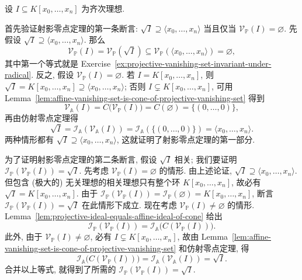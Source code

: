 \begingroup
\renewcommand{\AJProofBegin}{%
  \par\addvspace{\topsep}\noindent
  {\sffamily\bfseries\CJKfamily{pffont}Proof of Theorem~\ref{thm:projective-nullstellensatz}}\enspace\ignorespaces
}
\begin{Proof}
设 $I\subseteq K[x_{0},\ldots,x_{n}]$ 为齐次理想.

首先验证射影零点定理的第一条断言: $\sqrt{I}\supseteq\langle x_{0},\ldots,x_{n}\rangle$ 当且仅当 $\mathcal{V}_{\mathbb{P}}(I)=\varnothing$. 先假设 $\sqrt{I}\supseteq\langle x_{0},\ldots,x_{n}\rangle$. 那么
\[
  \mathcal{V}_{\mathbb{P}}(I)=\mathcal{V}_{\mathbb{P}}(\sqrt{I})
   \subseteq\mathcal{V}_{\mathbb{P}}(\langle x_{0},\ldots,x_{n}\rangle)=\varnothing,
\]
其中第一个等式就是 Exercise~\ref{ex:projective-vanishing-set-invariant-under-radical}. 反之, 假设 $\mathcal{V}_{\mathbb{P}}(I)=\varnothing$. 若 $I=K[x_{0},\ldots,x_{n}]$, 则 $\sqrt{I}=K[x_{0},\ldots,x_{n}]\supseteq\langle x_{0},\ldots,x_{n}\rangle$; 否则 $I\subsetneq K[x_{0},\ldots,x_{n}]$, 可用 Lemma~\ref{lem:affine-vanishing-set-is-cone-of-projective-vanishing-set} 得到
\[
  \mathcal{V}_{\mathbb{A}}(I)=C\bigl(\mathcal{V}_{\mathbb{P}}(I)\bigr)
    =C(\varnothing)=\{(0,\ldots,0)\},
\]
再由仿射零点定理得
\[
  \sqrt{I}=\mathcal{I}_{\mathbb{A}}(\mathcal{V}_{\mathbb{A}}(I))
  =\mathcal{I}_{\mathbb{A}}(\{(0,\ldots,0)\})=\langle x_{0},\ldots,x_{n}\rangle.
\]
两种情形都有 $\sqrt{I}\supseteq\langle x_{0},\ldots,x_{n}\rangle$, 这就证明了射影零点定理的第一部分.

为了证明射影零点定理的第二条断言, 假设 $\sqrt{I}$ 相关; 我们要证明 $\mathcal{I}_{\mathbb{P}}(\mathcal{V}_{\mathbb{P}}(I))=\sqrt{I}$. 先考虑 $\mathcal{V}_{\mathbb{P}}(I)=\varnothing$ 的情形. 由上述论证, $\sqrt{I}\supseteq\langle x_{0},\ldots,x_{n}\rangle$. 但包含 (极大的) 无关理想的相关理想只有整个环 $K[x_{0},\ldots,x_{n}]$, 故必有 $\sqrt{I}=K[x_{0},\ldots,x_{n}]$. 由于 $\mathcal{I}_{\mathbb{P}}(\mathcal{V}_{\mathbb{P}}(I))=\mathcal{I}_{\mathbb{P}}(\varnothing)=K[x_{0},\ldots,x_{n}]$, 断言 $\mathcal{I}_{\mathbb{P}}(\mathcal{V}_{\mathbb{P}}(I))=\sqrt{I}$ 在此情形下成立. 现在考虑 $\mathcal{V}_{\mathbb{P}}(I)\ne\varnothing$ 的情形. Lemma~\ref{lem:projective-ideal-equals-affine-ideal-of-cone} 给出
\[
  \mathcal{I}_{\mathbb{P}}(\mathcal{V}_{\mathbb{P}}(I))
    =\mathcal{I}_{\mathbb{A}}\bigl(C(\mathcal{V}_{\mathbb{P}}(I))\bigr).
\]
此外, 由于 $\mathcal{V}_{\mathbb{P}}(I)\ne\varnothing$, 必有 $I\subsetneq K[x_{0},\ldots,x_{n}]$, 故由 Lemma~\ref{lem:affine-vanishing-set-is-cone-of-projective-vanishing-set} 和仿射零点定理, 得
\[
  \mathcal{I}_{\mathbb{A}}\bigl(C(\mathcal{V}_{\mathbb{P}}(I))\bigr)
    =\mathcal{I}_{\mathbb{A}}(\mathcal{V}_{\mathbb{A}}(I))=\sqrt{I}.
\]
合并以上等式, 就得到了所需的 $\mathcal{I}_{\mathbb{P}}(\mathcal{V}_{\mathbb{P}}(I))=\sqrt{I}$.
\end{Proof}
\endgroup

